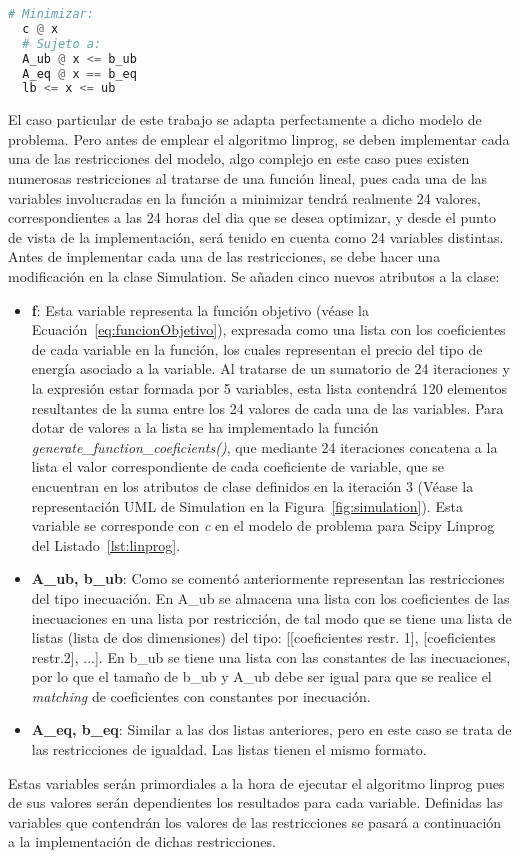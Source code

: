 \begin{lstlisting}[language=Python,float=ht,numbers=none,caption={Tipo de problema aplicable a Scipy.optimize.linprog},label={lst:linprog}]
  # Minimizar:
  c @ x
  # Sujeto a:
  A_ub @ x <= b_ub
  A_eq @ x == b_eq
  lb <= x <= ub
\end{lstlisting}
El caso particular de este trabajo se adapta perfectamente a dicho modelo de problema. Pero antes de emplear el algoritmo linprog, se deben implementar cada una de las restricciones del modelo, algo complejo en este caso pues existen numerosas restricciones al tratarse de una función lineal, pues cada una de las variables involucradas en la función a minimizar tendrá realmente 24 valores, correspondientes a las 24 horas del dia que se desea optimizar, y desde el punto de vista de la implementación, será tenido en cuenta como 24 variables distintas.\\

Antes de implementar cada una de las restricciones, se debe hacer una modificación en la clase Simulation. Se añaden cinco nuevos atributos a la clase:
\begin{itemize}
\item \textbf{f}: Esta variable representa la función objetivo (véase la Ecuación~\ref{eq:funcionObjetivo}), expresada como una lista con los coeficientes de cada variable en la función, los cuales representan el precio del tipo de energía asociado a la variable. Al tratarse de un sumatorio de 24 iteraciones y la expresión estar formada por 5 variables, esta lista contendrá 120 elementos resultantes de la suma entre los 24 valores de cada una de las variables. Para dotar de valores a la lista se ha implementado la función \textit{generate\_function\_coeficients()}, que mediante 24 iteraciones concatena a la lista el valor correspondiente de cada coeficiente de variable, que se encuentran en los atributos de clase definidos en la iteración 3 (Véase la representación UML de Simulation en la Figura~\ref{fig:simulation}). Esta variable se corresponde con \textit{c} en el modelo de problema para Scipy Linprog del Listado~\ref{lst:linprog}.
\item \textbf{A\_ub, b\_ub}: Como se comentó anteriormente representan las restricciones del tipo inecuación. En A\_ub se almacena una lista con los coeficientes de las inecuaciones en una lista por restricción, de tal modo que se tiene una lista de listas (lista de dos dimensiones) del tipo: [[coeficientes restr. 1], [coeficientes restr.2], ...]. En b\_ub se tiene una lista con las constantes de las inecuaciones, por lo que el tamaño de b\_ub y A\_ub debe ser igual para que se realice el \textit{matching} de coeficientes con constantes por inecuación.
\item \textbf{A\_eq, b\_eq}: Similar a las dos listas anteriores, pero en este caso se trata de las restricciones de igualdad. Las listas tienen el mismo formato.
\end{itemize}
Estas variables serán primordiales a la hora de ejecutar el algoritmo linprog pues de sus valores serán dependientes los resultados para cada variable. Definidas las variables que contendrán los valores de las restricciones se pasará a continuación a la implementación de dichas restricciones.
